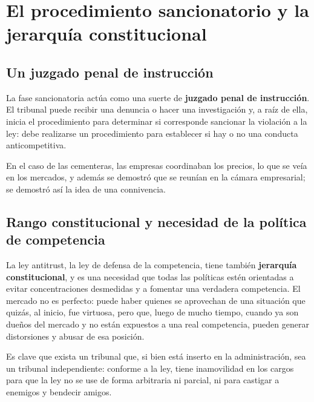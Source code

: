 \documentclass[12pt,oneside]{book}
\begin{document}
\section{El procedimiento sancionatorio y la jerarquía constitucional}

\subsection{Un juzgado penal de instrucción}

La fase sancionatoria actúa como una suerte de \textbf{juzgado penal de instrucción}. El tribunal puede recibir una denuncia o hacer una investigación y, a raíz de ella, inicia el procedimiento para determinar si corresponde sancionar la violación a la ley: debe realizarse un procedimiento para establecer si hay o no una conducta anticompetitiva.

En el caso de las cementeras, las empresas coordinaban los precios, lo que se veía en los mercados, y además se demostró que se reunían en la cámara empresarial; se demostró así la idea de una connivencia.


\subsection{Rango constitucional y necesidad de la política de competencia}

La ley antitrust, la ley de defensa de la competencia, tiene también \textbf{jerarquía constitucional}, y es una necesidad que todas las políticas estén orientadas a evitar concentraciones desmedidas y a fomentar una verdadera competencia. El mercado no es perfecto: puede haber quienes se aprovechan de una situación que quizás, al inicio, fue virtuosa, pero que, luego de mucho tiempo, cuando ya son dueños del mercado y no están expuestos a una real competencia, pueden generar distorsiones y abusar de esa posición.

Es clave que exista un tribunal que, si bien está inserto en la administración, sea un tribunal independiente: conforme a la ley, tiene inamovilidad en los cargos para que la ley no se use de forma arbitraria ni parcial, ni para castigar a enemigos y bendecir amigos.
\end{document}
